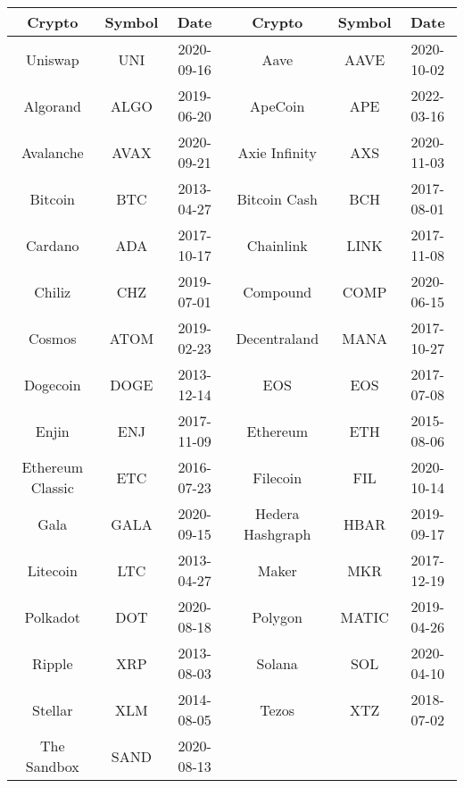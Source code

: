 \begin{tabular}{cccccc}
\toprule
Crypto & Symbol & Date & Crypto & Symbol & Date\\
\midrule
Uniswap & UNI & 2020-09-16 & Aave & AAVE & 2020-10-02\\
Algorand & ALGO & 2019-06-20 & ApeCoin & APE & 2022-03-16\\
Avalanche & AVAX & 2020-09-21 & Axie Infinity & AXS & 2020-11-03\\
Bitcoin & BTC & 2013-04-27 & Bitcoin Cash & BCH & 2017-08-01\\
Cardano & ADA & 2017-10-17 & Chainlink & LINK & 2017-11-08\\
Chiliz & CHZ & 2019-07-01 & Compound & COMP & 2020-06-15\\
Cosmos & ATOM & 2019-02-23 & Decentraland & MANA & 2017-10-27\\
Dogecoin & DOGE & 2013-12-14 & EOS & EOS & 2017-07-08\\
Enjin & ENJ & 2017-11-09 & Ethereum & ETH & 2015-08-06\\
Ethereum Classic & ETC & 2016-07-23 & Filecoin & FIL & 2020-10-14\\
Gala & GALA & 2020-09-15 & Hedera Hashgraph & HBAR & 2019-09-17\\
Litecoin & LTC & 2013-04-27 & Maker & MKR & 2017-12-19\\
Polkadot & DOT & 2020-08-18 & Polygon & MATIC & 2019-04-26\\
Ripple & XRP & 2013-08-03 & Solana & SOL & 2020-04-10\\
Stellar & XLM & 2014-08-05 & Tezos & XTZ & 2018-07-02\\
The Sandbox & SAND & 2020-08-13 & & &\\
\bottomrule
\end{tabular}

